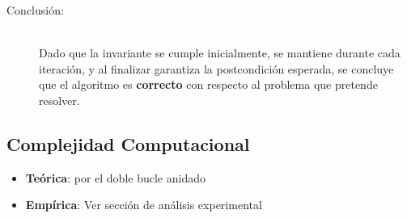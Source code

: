 \documentclass[main.tex]{subfiles}
\begin{document}
\begin{description}
	\item[Conclusión:] ~\\
	      Dado que la invariante se cumple inicialmente, se mantiene durante cada iteración, y al
	      finalizar garantiza la postcondición esperada, se concluye que el algoritmo es
	      \textbf{correcto} con respecto al problema que pretende resolver.
\end{description}


\subsection{Complejidad Computacional}

\begin{itemize}
	\item \textbf{Teórica}:  por el doble bucle anidado
	\item \textbf{Empírica}: Ver sección de análisis experimental
\end{itemize}
\end{document}
